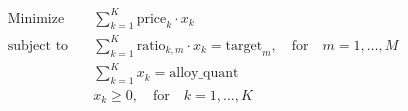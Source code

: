 \documentclass{article}
\begin{document}
\begin{align*}
\text{Minimize} \quad & \sum_{k=1}^{K} \text{price}_k \cdot x_k \\
\text{subject to} \quad & \sum_{k=1}^{K} \text{ratio}_{k,m} \cdot x_k = \text{target}_m, \quad \text{for} \quad m = 1, \ldots, M \\
& \sum_{k=1}^{K} x_k = \text{alloy\_quant} \\
& x_k \geq 0, \quad \text{for} \quad k = 1, \ldots, K
\end{align*}
\end{document}
